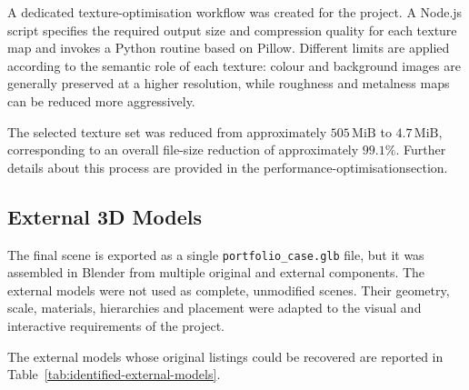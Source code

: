 \documentclass{report}
\begin{document}
A dedicated texture-optimisation workflow was created for the project.
A Node.js script specifies the required output size and compression quality for each texture map and invokes a Python routine based on Pillow. Different limits are applied according to the semantic role of each texture: colour and background images are generally preserved at
a higher resolution, while roughness and metalness maps can be reduced more aggressively.

The selected texture set was reduced from approximately
\(505\,\mathrm{MiB}\) to \(4.7\,\mathrm{MiB}\), corresponding to an overall file-size reduction of approximately \(99.1\%\). Further details about this process are provided in the performance-optimisationsection.

\subsection{External 3D Models}

The final scene is exported as a single
\texttt{portfolio\_case.glb} file, but it was assembled in Blender from
multiple original and external components. The external models were not
used as complete, unmodified scenes. Their geometry, scale, materials,
hierarchies and placement were adapted to the visual and interactive
requirements of the project.

The external models whose original listings could be recovered are
reported in Table~\ref{tab:identified-external-models}.
\end{document}
